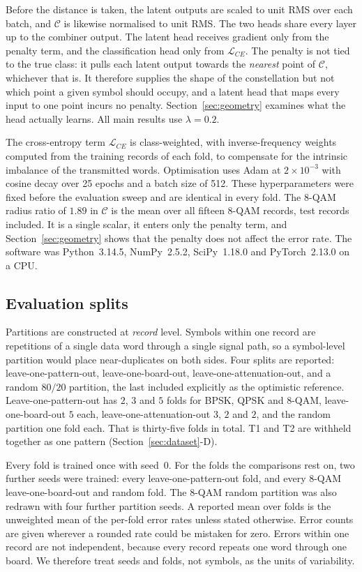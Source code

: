 \documentclass{ieeeaccess}
\begin{document}
Before the distance is taken, the latent outputs are scaled to unit RMS over each batch, and $\mathcal{C}$ is likewise normalised to unit RMS. The two heads share every layer up to the combiner output. The latent head receives gradient only from the penalty term, and the classification head only from $\mathcal{L}_{CE}$. The penalty is not tied to the true class: it pulls each latent output towards the \emph{nearest} point of $\mathcal{C}$, whichever that is. It therefore supplies the shape of the constellation but not which point a given symbol should occupy, and a latent head that maps every input to one point incurs no penalty. Section~\ref{sec:geometry} examines what the head actually learns. All main results use $\lambda = 0.2$.

The cross-entropy term $\mathcal{L}_{CE}$ is class-weighted, with inverse-frequency weights computed from the training records of each fold, to compensate for the intrinsic imbalance of the transmitted words. Optimisation uses Adam at $2 \times 10^{-3}$ with cosine decay over 25 epochs and a batch size of 512. These hyperparameters were fixed before the evaluation sweep and are identical in every fold. The 8-QAM radius ratio of $1.89$ in $\mathcal{C}$ is the mean over all fifteen 8-QAM records, test records included. It is a single scalar, it enters only the penalty term, and Section~\ref{sec:geometry} shows that the penalty does not affect the error rate. The software was Python~3.14.5, NumPy~2.5.2, SciPy~1.18.0 and PyTorch~2.13.0 on a CPU.

\subsection{Evaluation splits}
Partitions are constructed at \emph{record} level. Symbols within one record are
repetitions of a single data word through a single signal path, so a
symbol-level partition would place near-duplicates on both sides. Four splits
are reported: leave-one-pattern-out, leave-one-board-out,
leave-one-attenuation-out, and a random $80/20$ partition, the last included
explicitly as the optimistic reference. Leave-one-pattern-out has $2$, $3$ and
$5$ folds for BPSK, QPSK and 8-QAM, leave-one-board-out $5$ each,
leave-one-attenuation-out $3$, $2$ and $2$, and the random partition one fold
each. That is thirty-five folds in total. T1 and T2 are withheld together as
one pattern (Section~\ref{sec:dataset}-D).

Every fold is trained once with seed~0. For the folds the comparisons rest on,
two further seeds were trained: every leave-one-pattern-out fold, and every
8-QAM leave-one-board-out and random fold. The 8-QAM random partition was also
redrawn with four further partition seeds. A reported mean over folds is the
unweighted mean of the per-fold error rates unless stated otherwise. Error
counts are given wherever a rounded rate could be mistaken for zero. Errors
within one record are not independent, because every record repeats one word
through one board. We therefore treat seeds and folds, not symbols, as the
units of variability.
\end{document}
